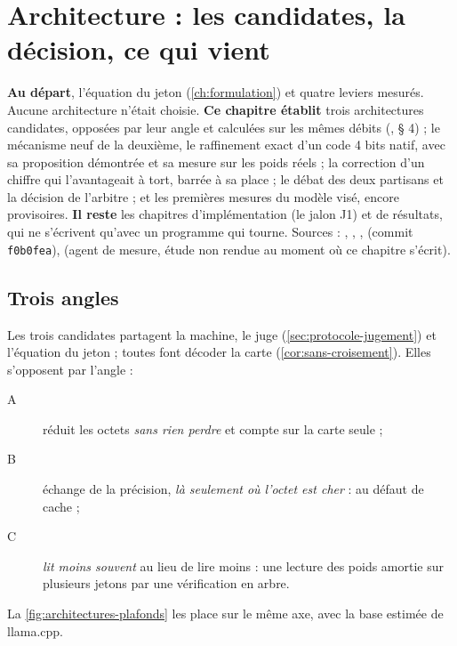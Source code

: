 \chapter{Architecture : les candidates, la décision, ce qui vient}\label{ch:avenir}

\begin{origine}
\textbf{Au départ}, l'équation du jeton (\cref{ch:formulation}) et quatre leviers mesurés. Aucune architecture n'était choisie.
\textbf{Ce chapitre établit} trois architectures candidates, opposées par leur angle et calculées sur les mêmes débits (, § 4) ; le mécanisme neuf de la deuxième, le raffinement exact d'un code 4 bits natif, avec sa proposition démontrée et sa mesure sur les poids réels ; la correction d'un chiffre qui l'avantageait à tort, barrée à sa place ; le débat des deux partisans et la décision de l'arbitre ; et les premières mesures du modèle visé, encore provisoires.
\textbf{Il reste} les chapitres d'implémentation (le jalon J1) et de résultats, qui ne s'écrivent qu'avec un programme qui tourne.
Sources : , , ,  (commit \texttt{f0b0fea}),  (agent de mesure, étude non rendue au moment où ce chapitre s'écrit).
\end{origine}

\section{Trois angles}\label{sec:trois-angles}

Les trois candidates partagent la machine, le juge (\cref{sec:protocole-jugement}) et l'équation du jeton ; toutes font décoder la carte (\cref{cor:sans-croisement}). Elles s'opposent par l'angle :
\begin{description}
\item[A] réduit les octets \emph{sans rien perdre} et compte sur la carte seule ;
\item[B] échange de la précision, \emph{là seulement où l'octet est cher} : au défaut de cache ;
\item[C] \emph{lit moins souvent} au lieu de lire moins : une lecture des poids amortie sur plusieurs jetons par une vérification en arbre.
\end{description}
La \cref{fig:architectures-plafonds} les place sur le même axe, avec la base estimée de llama.cpp.


